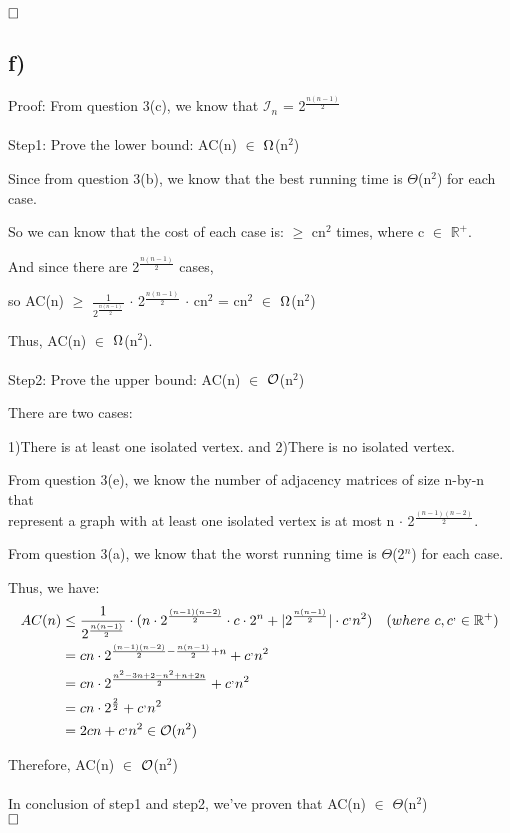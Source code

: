 \documentclass[12pt]{article}
\begin{document}
$\hfill\square$
\newpage

\subsection*{f)}
\vspace{30pt}
Proof: From question 3(c), we know that $\mathcal{I}$$_{n}$ = 2$^{\frac{n(n-1)}{2}}$\\
\\
Step1: Prove the lower bound: AC(n) $\in$ $\ohm$(n$^{2}$)

Since from question 3(b), we know that the best running time is $\Theta$(n$^{2}$) for each case.

So we can know that the cost of each case is: $\geq$ cn$^{2}$ times, where c $\in$ $\mathbb R^+$.

And since there are 2$^{\frac{n(n-1)}{2}}$ cases,

so AC(n) $\geq$ $\frac{1}{2^{\frac{n(n-1)}{2}}}$ $\cdot$ 2$^{\frac{n(n-1)}{2}}$ $\cdot$ cn$^{2}$ = cn$^{2}$    $\in$ $\ohm$(n$^{2}$)

Thus, AC(n) $\in$ $\ohm$(n$^{2}$).\\
\\
Step2: Prove the upper bound: AC(n) $\in$ $\mathcal O$(n$^{2}$)

There are two cases: 

1)There is at least one isolated vertex. and 2)There is no isolated vertex.

From question 3(e), we know the number of adjacency matrices of  size n-by-n that\\ 
represent a graph with at least one isolated vertex is at most n $\cdot$ 2$^{\frac{(n-1)(n-2)}{2}}$.

From question 3(a), we know that the worst running time is $\Theta$(2$^{n}$) for each case.

Thus, we have: 
\begin{align*} 
AC(n) &\leq \frac{1}{2^{\frac{n(n-1)}{2}}} \cdot (n \cdot 2^{\frac{(n-1)(n-2)}{2}} \cdot c \cdot 2^{n} + \lvert2^{\frac{n(n-1)}{2}}\rvert \cdot c^{,}n^{2}) \quad (where \ c,c^{,} \in \mathbb R^+)  \\
&= cn \cdot 2^{\frac{(n-1)(n-2)}{2}-\frac{n(n-1)}{2}+n}+c^{,}n^{2} \\
&= cn \cdot 2^{\frac{n^{2}-3n+2-n^{2}+n+2n}{2}}+c^{,}n^{2}\\
&=cn \cdot 2^{\frac{2}{2}}+c^{,}n^{2}\\
&=2cn+c^{,}n^{2} \in \cO(n^{2})
\end{align*}

Therefore,  AC(n) $\in$ $\mathcal O$(n$^{2}$) \\
\\
In conclusion of step1 and step2, we've proven that AC(n) $\in$ $\Theta$(n$^{2}$)\\



$\hfill\square$
\vspace{20pt}
\end{document}
